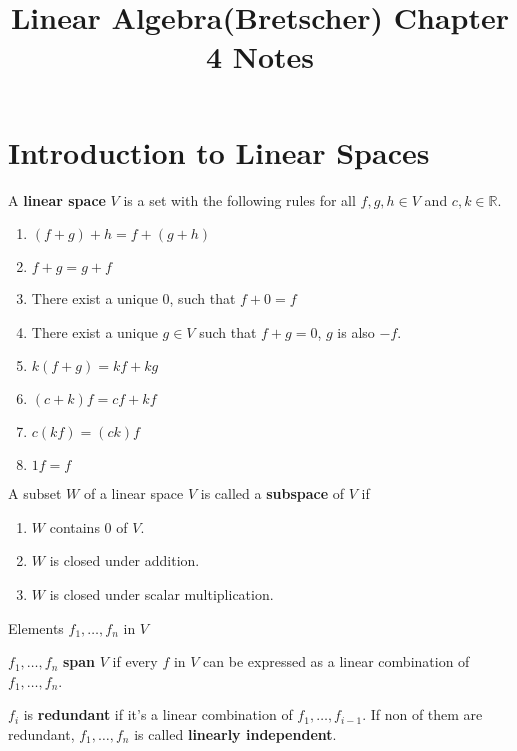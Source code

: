 \documentclass[letter]{article}
\title{Linear Algebra(Bretscher) Chapter 4 Notes}
\date{}
\newcommand{\R}{\mathbb{R}}
\newenvironment{definition}[1][Definition]{\begin{trivlist}
\item[\hskip \labelsep {\bfseries #1}]}{\end{trivlist}}
\begin{document}
\maketitle
\vspace{-.5in}

\section{Introduction to Linear Spaces}
\begin{definition}
A \textbf{linear space} $V$ is a set with the following rules for all $f,g,h \in V$ and $c,k\in \R$.
\begin{enumerate}
\item $(f+g)+h=f+(g+h)$
\item $f+g = g+f$
\item There exist a unique 0, such that $f+0 = f$
\item There exist a unique $g\in V$ such that $f+g = 0$, $g$ is also $-f$.
\item $k(f+g) = kf + kg$
\item $(c+k)f = cf + kf$
\item $c(kf) = (ck)f$
\item $1f = f$
\end{enumerate}
\end{definition}
\begin{definition}
A subset $W$ of a linear space $V$ is called a \textbf{subspace} of $V$ if
\begin{enumerate}
\item $W$ contains 0 of $V$.
\item $W$ is closed under addition.
\item $W$ is closed under scalar multiplication.
\end{enumerate}
\end{definition}

Elements $f_1,\ldots,f_n$ in $V$\\
\begin{definition}
$f_1,\ldots,f_n$ \textbf{span} $V$ if every $f$ in $V$ can be expressed as a linear combination of $f_1,\ldots,f_n$.
\end{definition}

\begin{definition}
$f_i$ is \textbf{redundant} if it's a linear combination of $f_1,\ldots,f_{i-1}$. If non of them are redundant, $f_1,\ldots,f_n$ is called \textbf{linearly independent}.
\end{definition}
\end{document}
